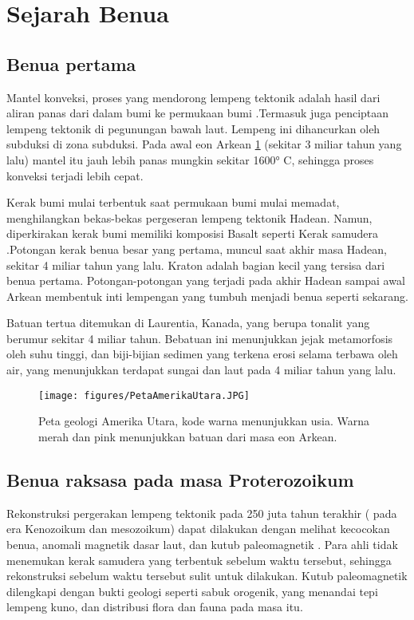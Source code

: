 
\section{Sejarah Benua}

\subsection{Benua pertama}
Mantel konveksi, proses yang mendorong lempeng tektonik adalah hasil dari aliran panas dari dalam bumi ke permukaan bumi \cite{suryasejarah}.Termasuk juga penciptaan lempeng tektonik di pegunungan bawah laut. Lempeng ini dihancurkan oleh subduksi di zona subduksi. Pada awal eon Arkean \ref{Peta Amerika Utara} (sekitar 3 miliar tahun yang lalu) mantel itu jauh lebih panas mungkin sekitar 1600° C, sehingga proses konveksi terjadi lebih cepat.

Kerak bumi mulai terbentuk saat permukaan bumi mulai memadat, menghilangkan bekas-bekas pergeseran lempeng tektonik Hadean. Namun, diperkirakan kerak bumi memiliki komposisi Basalt seperti Kerak samudera .Potongan kerak benua besar yang pertama, muncul saat akhir masa Hadean, sekitar 4 miliar tahun yang lalu.  Kraton adalah bagian kecil yang tersisa dari benua pertama. Potongan-potongan yang terjadi pada akhir Hadean sampai awal Arkean membentuk inti lempengan yang tumbuh menjadi benua seperti sekarang.

Batuan tertua ditemukan di Laurentia, Kanada, yang berupa tonalit yang berumur sekitar 4 miliar tahun. Bebatuan ini menunjukkan jejak metamorfosis oleh suhu tinggi,  dan biji-bijian sedimen yang terkena erosi selama terbawa oleh air, yang menunjukkan terdapat sungai dan laut pada 4 miliar tahun yang lalu.

\begin{figure}[ht]
    \centerline{\texttt{[image: figures/PetaAmerikaUtara.JPG]}}
    \caption{Peta geologi Amerika Utara, kode warna menunjukkan usia. Warna merah dan pink menunjukkan batuan dari masa eon Arkean.}
    \label{Peta Amerika Utara}
    \end{figure}


\subsection{Benua raksasa pada masa Proterozoikum} 
Rekonstruksi pergerakan lempeng tektonik pada 250 juta tahun terakhir ( pada era Kenozoikum dan mesozoikum) dapat dilakukan dengan melihat kecocokan benua, anomali magnetik dasar laut, dan kutub paleomagnetik \cite{suryasejarah}. Para ahli tidak menemukan kerak samudera yang terbentuk sebelum waktu tersebut, sehingga rekonstruksi sebelum waktu tersebut sulit untuk dilakukan. Kutub paleomagnetik dilengkapi dengan bukti geologi seperti sabuk orogenik, yang menandai tepi lempeng kuno, dan distribusi flora dan fauna pada masa itu.

